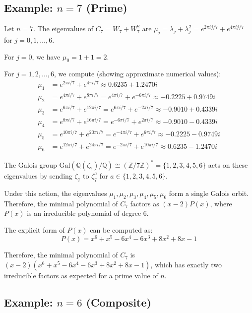 \subsection{Example: $n = 7$ (Prime)}

Let $n = 7$. The eigenvalues of $C_7 = W_7 + W_7^2$ are $\mu_j = \lambda_j + \lambda_j^2 = e^{2\pi i j/7} + e^{4\pi i j/7}$ for $j = 0, 1, \ldots, 6$.

For $j = 0$, we have $\mu_0 = 1 + 1 = 2$.

For $j = 1, 2, \ldots, 6$, we compute (showing approximate numerical values):
\begin{align}
\mu_1 &= e^{2\pi i/7} + e^{4\pi i/7} \approx 0.6235 + 1.2470i\\
\mu_2 &= e^{4\pi i/7} + e^{8\pi i/7} = e^{4\pi i/7} + e^{-6\pi i/7} \approx -0.2225 + 0.9749i\\
\mu_3 &= e^{6\pi i/7} + e^{12\pi i/7} = e^{6\pi i/7} + e^{-2\pi i/7} \approx -0.9010 + 0.4339i\\
\mu_4 &= e^{8\pi i/7} + e^{16\pi i/7} = e^{-6\pi i/7} + e^{2\pi i/7} \approx -0.9010 - 0.4339i\\
\mu_5 &= e^{10\pi i/7} + e^{20\pi i/7} = e^{-4\pi i/7} + e^{6\pi i/7} \approx -0.2225 - 0.9749i\\
\mu_6 &= e^{12\pi i/7} + e^{24\pi i/7} = e^{-2\pi i/7} + e^{10\pi i/7} \approx 0.6235 - 1.2470i
\end{align}

The Galois group $\text{Gal}(\mathbb{Q}(\zeta_7)/\mathbb{Q}) \cong (\mathbb{Z}/7\mathbb{Z})^* = \{1, 2, 3, 4, 5, 6\}$ acts on these eigenvalues by sending $\zeta_7$ to $\zeta_7^a$ for $a \in \{1, 2, 3, 4, 5, 6\}$.

Under this action, the eigenvalues $\mu_1, \mu_2, \mu_3, \mu_4, \mu_5, \mu_6$ form a single Galois orbit. Therefore, the minimal polynomial of $C_7$ factors as $(x-2)P(x)$, where $P(x)$ is an irreducible polynomial of degree 6.

The explicit form of $P(x)$ can be computed as:
\[
P(x) = x^6 + x^5 - 6x^4 - 6x^3 + 8x^2 + 8x - 1
\]

Therefore, the minimal polynomial of $C_7$ is $(x-2)(x^6 + x^5 - 6x^4 - 6x^3 + 8x^2 + 8x - 1)$, which has exactly two irreducible factors as expected for a prime value of $n$.

\subsection{Example: $n = 6$ (Composite)}

